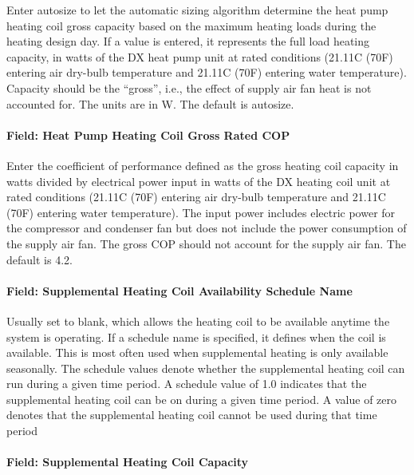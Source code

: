 Enter autosize to let the automatic sizing algorithm determine the heat pump heating coil gross capacity based on the maximum heating loads during the heating design day. If a value is entered, it represents the full load heating capacity, in watts of the DX heat pump unit at rated conditions (21.11C (70F) entering air dry-bulb temperature and 21.11C (70F) entering water temperature). Capacity should be the ``gross'', i.e., the effect of supply air fan heat is not accounted for. The units are in W. The default is autosize.

\paragraph{Field: Heat Pump Heating Coil Gross Rated COP}\label{field-heat-pump-heating-coil-gross-rated-cop-1}

Enter the coefficient of performance defined as the gross heating coil capacity in watts divided by electrical power input in watts of the DX heating coil unit at rated conditions (21.11C (70F) entering air dry-bulb temperature and 21.11C (70F) entering water temperature). The input power includes electric power for the compressor and condenser fan but does not include the power consumption of the supply air fan. The gross COP should not account for the supply air fan. The default is 4.2.

\paragraph{Field: Supplemental Heating Coil Availability Schedule Name}\label{field-supplemental-heating-coil-availability-schedule-name-1}

Usually set to blank, which allows the heating coil to be available anytime the system is operating. If a schedule name is specified, it defines when the coil is available. This is most often used when supplemental heating is only available seasonally. The schedule values denote whether the supplemental heating coil can run during a given time period. A schedule value of 1.0 indicates that the supplemental heating coil can be on during a given time period. A value of zero denotes that the supplemental heating coil cannot be used during that time period

\paragraph{Field: Supplemental Heating Coil Capacity}\label{field-supplemental-heating-coil-capacity-1}

